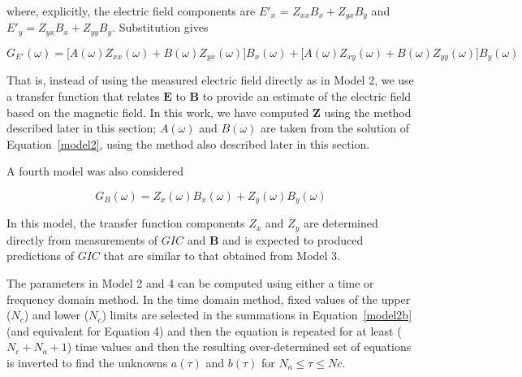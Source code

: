 \documentclass[draft,linenumbers]{agujournal2018}
\begin{document}
\noindent
where, explicitly, the electric field components are $E'_x$ = $Z_{xx}B_x + Z_{yx}B_y$ and $E'_y = Z_{yx}B_x + Z_{yy}B_y$. Substitution gives

\begin{equation*}
G_{E'}(\omega) = \big[A(\omega)Z_{xx}(\omega) + B(\omega)Z_{yx}(\omega) \big] B_x(\omega) + \big[ A(\omega)Z_{xy}(\omega) + B(\omega)Z_{yy}(\omega) \big] B_y(\omega)
\end{equation*}

That is, instead of using the measured electric field directly as in Model 2, we use a transfer function that relates $\mathbf{E}$ to $\mathbf{B}$ to provide an estimate of the electric field based on the magnetic field. In this work, we have computed $\mathbf{Z}$ using the method described later in this section; $A(\omega)$ and $B(\omega)$ are taken from the solution of Equation~\ref{model2}, using the method also described later in this section.

A fourth model was also considered

\begin{linenomath*}
\begin{equation}
G_B(\omega) = Z_x(\omega)B_x(\omega) + Z_y(\omega)B_y(\omega)
\end{equation}
\end{linenomath*}

\noindent
In this model, the transfer function components $Z_x$ and $Z_y$ are determined directly from measurements of $GIC$ and $\mathbf{B}$ and is expected to produced predictions of $GIC$ that are similar to that obtained from Model 3.

The parameters in Model 2 and 4 can be computed using either a time or frequency domain method. In the time domain method, fixed values of the upper ($N_c$) and lower ($N_c$) limits are selected in the summations in Equation~\ref{model2b} (and equivalent for Equation 4) and then the equation is repeated for at least ($N_c+N_a+1$) time values and then the resulting over-determined set of equations is inverted to find the unknowns $a(\tau)$ and $b(\tau)$ for $N_a \le \tau \le Nc$.
\end{document}

